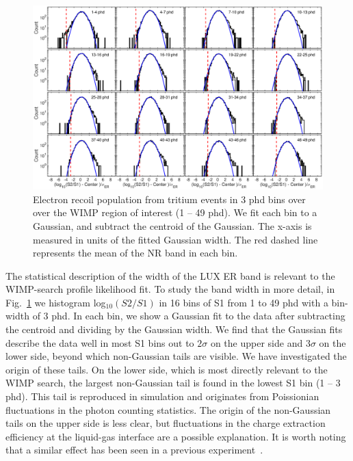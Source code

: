 \onecolumngrid
\break
\begin{figure}[t!]
\includegraphics[width=140mm]{fig/fig13.eps}
\caption{Electron recoil population from tritium events in 3 phd bins over over the WIMP region of interest (1 -- 49 phd). We fit each bin to a Gaussian, and subtract the centroid of the Gaussian. The x-axis is measured in units of the fitted Gaussian width. The red dashed line represents the mean of the NR band in each bin. }
\label{fig:ER-Gauss}
\end{figure}
\twocolumngrid


The statistical description of the width of the LUX ER band is relevant to the WIMP-search profile likelihood fit. To study the band width in more detail, in Fig.~\ref{fig:ER-Gauss} we histogram log$_{10}(S2/S1)$ in 16 bins of S1 from 1 to 49 phd with a bin-width of 3 phd. In each bin, we show a Gaussian fit to the data after subtracting the centroid and dividing by the Gaussian width. We find that the Gaussian fits describe the data well  in most S1 bins out to $2\sigma$ on the upper side and $3\sigma$ on the lower side, beyond which non-Gaussian tails are visible.  We have investigated the origin of these tails. On the lower side, which is most directly relevant to the WIMP search, the largest non-Gaussian tail is found in the lowest S1 bin (1 -- 3 phd). This tail is reproduced in simulation and originates from Poissionian fluctuations in the photon counting statistics. The origin of the non-Gaussian tails on the upper side is less clear, but fluctuations in the charge extraction efficiency at the liquid-gas interface are a possible explanation. It is worth noting that a similar effect has been seen in a previous experiment~\cite{zep3}.

